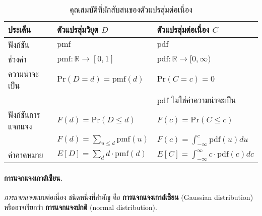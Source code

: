 \begin{table}[hbtp]
		\caption{คุณสมบัติที่มักสับสนของตัวแปรสุ่มต่อเนื่อง}
		\begin{center}
			\begin{tabular}{l|l|l}
				\hline
ประเด็น & ตัวแปรสุ่มวิยุต $D$ & ตัวแปรสุ่มต่อเนื่อง $C$
\\ \hline
ฟังก์ชัน & $\mathrm{pmf}$ & $\mathrm{pdf}$ 
\nonumber \\
ช่วงค่า  & $\mathrm{pmf}: \mathbb{R} \rightarrow [0, 1]$
& $\mathrm{pdf}: \mathbb{R} \rightarrow [0, \infty)$
\\
ความน่าจะเป็น & $\mathrm{Pr}(D = d) = \mathrm{pmf}(d)$			
& $\mathrm{Pr}(C = c) = 0$ \\	
& & $\mathrm{pdf}$ ไม่ใช่ค่าความน่าจะเป็น
\\
\hline
ฟังก์ชันการแจกแจง & $F(d) = \mathrm{Pr}(D \leq d)$ & $F(c) = \mathrm{Pr}(C \leq c)$
\\
& $F(d)= \sum_{u \leq d} \mathrm{pmf}(u)$
&
  $F(c)= \int_{-\infty}^c \mathrm{pdf}(u) du$
\\
\hline
ค่าคาดหมาย & $E[D] = \sum_d d \cdot \mathrm{pmf}(d)$
& $E[C] = \int_{-\infty}^{\infty} c \cdot \mathrm{pdf}(c) dc$
\\
\hline
			\end{tabular} 
		\end{center}
		\label{tbl: prob continuous rv}
\end{table}


\paragraph{การแจกแจงเกาส์เซียน.}
\textit{การแจกแจง}แบบต่อเนื่อง ชนิดหนึ่งที่สำคัญ คือ
\textbf{การแจกแจงเกาส์เซียน} (Gaussian distribution)
หรืออาจเรียกว่า 
\textbf{การแจกแจงปกติ} (normal distribution).


